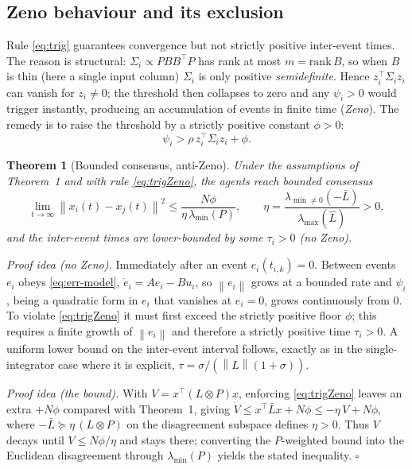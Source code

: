 \documentclass[11pt,a4paper]{article}
\newtheorem{theorem}{Theorem}
\theoremstyle{remark}
\newcommand{\kron}{\otimes}
\newcommand{\norm}[1]{\left\lVert#1\right\rVert}
\newcommand{\T}{^{\top}}
\begin{document}
\subsection{Zeno behaviour and its exclusion}
Rule \eqref{eq:trig} guarantees convergence but not strictly positive inter-event times. The reason
is structural: $\Sigma_i\propto PBB\T P$ has rank at most $m=\mathrm{rank}\,B$, so when $B$ is thin
(here a single input column) $\Sigma_i$ is only positive \emph{semidefinite}. Hence $z_i\T\Sigma_i
z_i$ can vanish for $z_i\neq 0$; the threshold then collapses to zero and any $\psi_i>0$ would
trigger instantly, producing an accumulation of events in finite time (\emph{Zeno}). The remedy is to
raise the threshold by a strictly positive constant $\phi>0$:
\begin{equation}
\psi_i > \rho\, z_i\T\Sigma_i z_i + \phi.
\label{eq:trigZeno}
\end{equation}

\begin{theorem}[Bounded consensus, anti-Zeno]
Under the assumptions of Theorem~1 and with rule \eqref{eq:trigZeno}, the agents reach
\emph{bounded consensus}
\[
\lim_{t\to\infty}\norm{x_i(t)-x_j(t)}^2 \le \frac{N\phi}{\eta\,\lambda_{\min}(P)},
\qquad \eta = \frac{\lambda_{\min\neq 0}(-\bar L)}{\lambda_{\max}(\hat L)}>0,
\]
and the inter-event times are lower-bounded by some $\tau_i>0$ (no Zeno).
\end{theorem}

\emph{Proof idea (no Zeno).} Immediately after an event $e_i(t_{i,k})=0$. Between events $e_i$ obeys
\eqref{eq:err-model}, $\dot e_i=Ae_i-Bu_i$, so $\norm{e_i}$ grows at a bounded rate and $\psi_i$,
being a quadratic form in $e_i$ that vanishes at $e_i=0$, grows continuously from $0$. To violate
\eqref{eq:trigZeno} it must first exceed the strictly positive floor $\phi$; this requires a finite
growth of $\norm{e_i}$ and therefore a strictly positive time $\tau_i>0$. A uniform lower bound on
the inter-event interval follows, exactly as in the single-integrator case where it is explicit,
$\tau=\sigma/(\norm{L}(1+\sigma))$.

\emph{Proof idea (the bound).} With $V=x\T(L\kron P)x$, enforcing \eqref{eq:trigZeno} leaves an extra
$+N\phi$ compared with Theorem~1, giving $\dot V\le x\T\bar L x + N\phi \le -\eta\,V + N\phi$, where
$-\bar L\succeq \eta\,(L\kron P)$ on the disagreement subspace defines $\eta>0$. Thus $V$ decays until
$V\le N\phi/\eta$ and stays there; converting the $P$-weighted bound into the Euclidean disagreement
through $\lambda_{\min}(P)$ yields the stated inequality. \hfill$\square$
\end{document}
